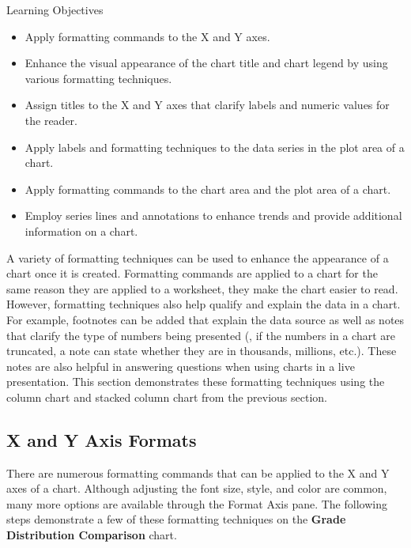 \begin{center}
	\begin{objbox}{Learning Objectives}
		\begin{itemize}
			\setlength{\itemsep}{0pt}
			\setlength{\parskip}{0pt}
			\setlength{\parsep}{0pt}

			\item Apply formatting commands to the X and Y axes.
			\item Enhance the visual appearance of the chart title and chart legend by using various formatting techniques.
			\item Assign titles to the X and Y axes that clarify labels and numeric values for the reader.
			\item Apply labels and formatting techniques to the data series in the plot area of a chart.
			\item Apply formatting commands to the chart area and the plot area of a chart.
			\item Employ series lines and annotations to enhance trends and provide additional information on a chart.
			
		\end{itemize}
	\end{objbox}
\end{center}

A variety of formatting techniques can be used to enhance the appearance of a chart once it is created. Formatting commands are applied to a chart for the same reason they are applied to a worksheet, they make the chart easier to read. However, formatting techniques also help qualify and explain the data in a chart. For example, footnotes can be added that explain the data source as well as notes that clarify the type of numbers being presented (\ie, if the numbers in a chart are truncated, a note can state whether they are in thousands, millions, etc.). These notes are also helpful in answering questions when using charts in a live presentation. This section demonstrates these formatting techniques using the column chart and stacked column chart from the previous section.

\subsection{X and Y Axis Formats}

There are numerous formatting commands that can be applied to the X and Y axes of a chart. Although adjusting the font size, style, and color are common, many more options are available through the Format Axis pane. The following steps demonstrate a few of these formatting techniques on the \textbf{Grade Distribution Comparison} chart.

